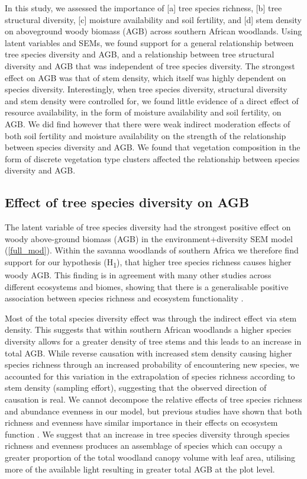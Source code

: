 \documentclass[11pt,a4paper]{article}
\begin{document}
In this study, we assessed the importance of [a] tree species richness, [b] tree structural diversity, [c] moisture availability and soil fertility, and [d] stem density on aboveground woody biomass (AGB) across southern African woodlands. Using latent variables and SEMs, we found support for a general relationship between tree species diversity and AGB, and a relationship between tree structural diversity and AGB that was independent of tree species diversity. The strongest effect on AGB was that of stem density, which itself was highly dependent on species diversity. Interestingly, when tree species diversity, structural diversity and stem density were controlled for, we found little evidence of a direct effect of resource availability, in the form of moisture availability and soil fertility, on AGB. We did find however that there were weak indirect moderation effects of both soil fertility and moisture availability on the strength of the relationship between species diversity and AGB. We found that vegetation composition in the form of discrete vegetation type clusters affected the relationship between species diversity and AGB.

\subsection{Effect of tree species diversity on AGB}

The latent variable of tree species diversity had the strongest positive effect on woody above-ground biomass (AGB) in the environment+diversity SEM model (\autoref{full_mod}). Within the savanna woodlands of southern Africa we therefore find support for our hypothesis (H\textsubscript{1}), that higher tree species richness causes higher woody AGB. This finding is in agreement with many other studies across different ecosystems and biomes, showing that there is a generalisable positive association between species richness and ecosystem functionality \citep{Liang2016, Cardinale2009}. 

Most of the total species diversity effect was through the indirect effect via stem density. This suggests that within southern African woodlands a higher species diversity allows for a greater density of tree stems and this leads to an increase in total AGB. While reverse causation with increased stem density causing higher species richness through an increased probability of encountering new species, we accounted for this variation in the extrapolation of species richness according to stem density (sampling effort), suggesting that the observed direction of causation is real. We cannot decompose the relative effects of tree species richness and abundance evenness in our model, but previous studies have shown that both richness and evenness have similar importance in their effects on ecosystem function \citep{Valery2009, Zhang2012}. We suggest that an increase in tree species diversity through species richness and evenness produces an assemblage of species which can occupy a greater proportion of the total woodland canopy volume with leaf area, utilising more of the available light resulting in greater total AGB at the plot level. 
\end{document}

